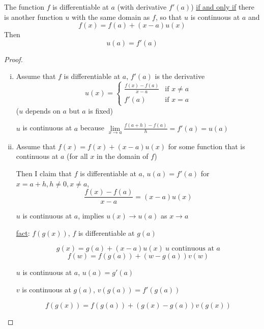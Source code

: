 \begin{theorem*}
  The function $f$ is differentiable at $a$ (with derivative $f'(a)$) \underline{if and only if} 
  there is another function $u$ with the same domain as $f$, 
  so that $u$ is continuous at $a$ and $$f(x) = f(a) + (x-a)u(x)$$
  Then $$u(a) = f'(a)$$
\end{theorem*}

\begin{proof}
  \text{}
  \begin{enumerate}[(i)]
    \item Assume that $f$ is differentiable at $a$, $f'(a)$ is the derivative
  \[
    u(x) = \begin{cases}
      \frac{f(x) - f(a)}{x-a} & \text{if } x \neq a \\
      f'(a) & \text{if } x = a
    \end{cases} 
  \]
  ($u$ depends on $a$ but $a$ is fixed)

  $u$ is continuous at $a$ because $\lim\limits_{x \to a} \frac{f(a+h) - f(a)}{h} = f'(a) = u(a)$
  \item Assume that $f(x) = f(x) + (x-a)u(x)$ for some function that is continuous at $a$ (for all $x$ in the domain of $f$)
  
  Then I claim that $f$ is differentiable at $a$, $u(a) = f'(a)$ for $x = a + h, h \neq 0, x \neq a$, 
  $$\frac{f(x) - f(a)}{x-a} = (x-a)u(x)$$
  
  $u$ is continuous at $a$, implies $u(x) \to u(a)$ as $x \to a$

  \underline{fact}: $f(g(x))$, $f$ is differentiable at $g(a)$

  $$g(x) = g(a) + (x-a)u(x)\ u \text{ continuous at }a$$
  $$f(w) = f(g(a)) + (w - g(a))v(w)$$

  $u$ is continuous at $a$, $u(a) = g'(a)$

  $v$ is continuous at $g(a)$, $v(g(a)) = f'(g(a))$

  $$f(g(x)) = f(g(a)) + (g(x) - g(a))v(g(x))$$
  \end{enumerate}

\end{proof}

